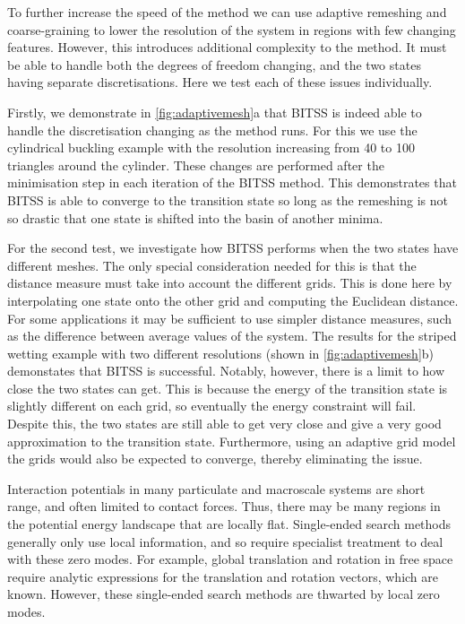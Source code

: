 \documentclass[aps,twocolumn]{revtex4-1}
\begin{document}
\topic To further increase the speed of the method we can use adaptive remeshing and coarse-graining to lower the resolution of the system in regions with few changing features.
However, this introduces additional complexity to the method.
It must be able to handle both the degrees of freedom changing, and the two states having separate discretisations.
Here we test each of these issues individually.

\topic Firstly, we demonstrate in \cref{fig:adaptivemesh}a that BITSS is indeed able to handle the discretisation changing as the method runs.
For this we use the cylindrical buckling example with the resolution increasing from 40 to 100 triangles around the cylinder.
These changes are performed after the minimisation step in each iteration of the BITSS method.
This demonstrates that BITSS is able to converge to the transition state so long as the remeshing is not so drastic that one state is shifted into the basin of another minima.

\topic For the second test, we investigate how BITSS performs when the two states have different meshes.
The only special consideration needed for this is that the distance measure must take into account the different grids.
This is done here by interpolating one state onto the other grid and computing the Euclidean distance.
For some applications it may be sufficient to use simpler distance measures, such as the difference between average values of the system.
The results for the striped wetting example with two different resolutions (shown in \cref{fig:adaptivemesh}b) demonstates that BITSS is successful.
Notably, however, there is a limit to how close the two states can get.
This is because the energy of the transition state is slightly different on each grid, so eventually the energy constraint will fail.
Despite this, the two states are still able to get very close and give a very good approximation to the transition state.
Furthermore, using an adaptive grid model the grids would also be expected to converge, thereby eliminating the issue.


\topic Interaction potentials in many particulate and macroscale systems are short range, and often limited to contact forces.
Thus, there may be many regions in the potential energy landscape that are locally flat.
Single-ended search methods generally only use local information, and so require specialist treatment to deal with these zero modes.
For example, global translation and rotation in free space require analytic expressions for the translation and rotation vectors, which are known.
However, these single-ended search methods are thwarted by local zero modes.
\end{document}
